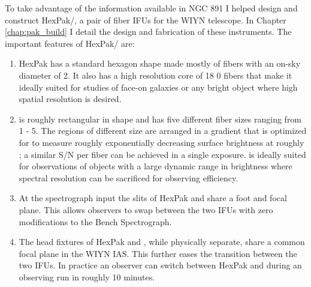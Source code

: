 To take advantage of the information available in NGC 891 I helped
design and construct HexPak/\GP, a pair of fiber IFUs for the WIYN
telescope. In Chapter \ref{chap:pak_build} I detail the design and
fabrication of these instruments. The important features of HexPak/\GP
are:
\begin{enumerate}
\item HexPak has a standard hexagon shape made mostly of fibers with
  an on-sky diameter of 2. It also has a high resolution core
  of 18 0 fibers that make it ideally suited for studies of
  face-on galaxies or any bright object where high spatial resolution
  is desired.

\item \GP is roughly rectangular in shape and has five different fiber
  sizes ranging from 1 - 5. The regions of different
  size are arranged in a gradient that is optimized for to measure
  roughly exponentially decreasing surface brightness at roughly
  ; a similar S/N per fiber can be achieved in a single
  exposure. \GP is ideally suited for observations of objects with a
  large dynamic range in brightness where spectral resolution can be
  sacrificed for observing efficiency.

\item At the spectrograph input the slits of HexPak and \GP share a
  foot and focal plane. This allows observers to swap between the two
  IFUs with zero modifications to the Bench Spectrograph.

\item The head fixtures of HexPak and \GP, while physically separate,
  share a common focal plane in the WIYN IAS. This further eases the
  transition between the two IFUs. In practice an observer can switch
  between HexPak and \GP during an observing run in roughly 10
  minutes.

\end{enumerate}

